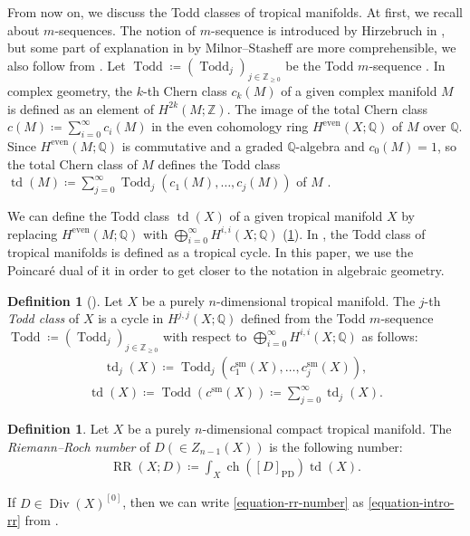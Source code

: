 \documentclass[a4paper,dvipdfmx,reqno,12pt]{amsart}
\theoremstyle{definition}
\newtheorem{definition}[theorem]{Definition}
\newcommand{\deq}{\coloneqq}
\newcommand{\opn}[1]{\operatorname{#1}}
\newcommand{\PD}[1]{[#1]_{\mathrm{PD}}}
\numberwithin{equation}{section}
\begin{document}
From now on, we discuss the Todd classes of
tropical manifolds.
At first, we recall about $m$-sequences.
The notion of $m$-sequence is introduced
by Hirzebruch in \cite[]{MR1335917},
but some part of explanation in
\cite[]{MR440554}
by Milnor--Stasheff are more comprehensible,
we also follow from \cite[]{MR440554}.
Let $\opn{Todd}\deq 
(\opn{Todd}_j)_{j\in \mathbb{Z}_{\geq 0}}$ be 
the Todd $m$-sequence \cite[]{MR1335917}.
In complex geometry, the $k$-th Chern class
$c_k(M)$ of a given complex manifold $M$ is 
defined as an element of $H^{2k}(M;\mathbb{Z})$.
The image of the total Chern class 
$c(M)\deq \sum_{i=0}^{\infty}c_i(M)$
in the even cohomology ring $H^{\mathrm{even}}(X;\mathbb{Q})$
of $M$ over $\mathbb{Q}$.
Since $H^{\mathrm{even}}(M;\mathbb{Q})$
is commutative and a graded $\mathbb{Q}$-algebra
and $c_0(M)=1$,
so the total Chern class of $M$ defines 
the Todd class $\opn{td}(M)\deq \sum_{j=0}^{\infty}
\opn{Todd}_j(c_{1}(M),\ldots,c_{j}(M))$ of $M$
\cite[]{MR1335917}.
 
We can define the Todd class
$\opn{td}(X)$ of a given tropical manifold
$X$ by replacing 
$H^{\mathrm{even}}(M;\mathbb{Q})$ with
$\bigoplus_{i=0}^{\infty} H^{i,i}(X;\mathbb{Q})$
(\cref{definition-tropical-todd}).
In \cite[Conjecture 6.13]{demedrano2023chern},
the Todd class of tropical manifolds is
defined as a tropical cycle.
In this paper, we use the Poincar\'e dual of it
in order to get closer to the notation 
in algebraic geometry.

\begin{definition}[{\cite[]{demedrano2023chern}}]
\label{definition-tropical-todd}
Let $X$ be a purely $n$-dimensional tropical manifold.
The $j$-th \emph{Todd class} of $X$ is
a cycle in $H^{j,j}(X;\mathbb{Q})$
defined from 
the Todd $m$-sequence 
$\opn{Todd}\deq (\opn{Todd}_j)_{j\in \mathbb{Z}_{\geq 0}}$
with respect to $\bigoplus_{i=0}^{\infty}
H^{i,i}(X;\mathbb{Q})$ as follows:
\begin{align}
\opn{td}_j(X)\deq \opn{Todd}_j(c_{1}^{\mathrm{sm}}(X),
\ldots,c_{j}^{\mathrm{sm}}(X)),
\end{align}
\begin{align}
\opn{td}(X)\deq
\opn{Todd}(c^{\mathrm{sm}}(X))\deq
\sum_{j=0}^{\infty}\opn{td}_j(X).
\end{align}

\end{definition}



\begin{definition}
\label{definition-rr-number}
Let $X$ be a purely $n$-dimensional
compact tropical manifold.
The \emph{Riemann--Roch number}
of $D(\in Z_{n-1}(X))$ is the following number:
\begin{align}
\label{equation-rr-number}
\opn{RR}(X;D)\deq \int_X \opn{ch}(\PD{D})\opn{td}(X).
\end{align}
\end{definition}
If $D\in \opn{Div}(X)^{[0]}$,
then we can write \cref{equation-rr-number}
as \cref{equation-intro-rr}
from \cite[Proposition 5.12]{MR4637248}.
\end{document}
